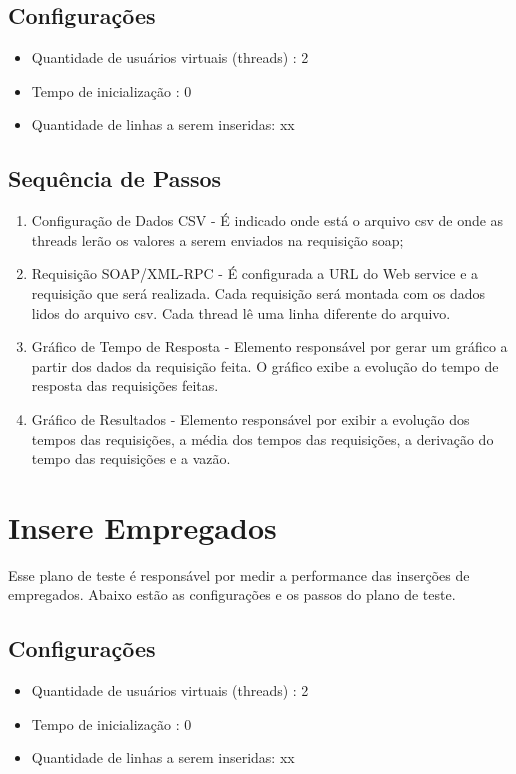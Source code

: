 \subsection{Configurações}

\begin{itemize}
\item Quantidade de usuários virtuais (threads) : 2
\item Tempo de inicialização : 0
\item Quantidade de linhas a serem inseridas: xx
\end{itemize}

\subsection{Sequência de Passos}

\begin{enumerate}
\item Configuração de Dados CSV - É indicado onde está o arquivo csv de onde as threads lerão os valores a serem enviados na requisição soap;
\item Requisição SOAP/XML-RPC - É configurada a URL do Web service e a requisição que será realizada. Cada requisição será montada com os dados lidos do arquivo csv. Cada thread lê uma linha diferente do arquivo.
\item Gráfico de Tempo de Resposta -  Elemento responsável por gerar um gráfico a partir dos dados da requisição feita. O gráfico exibe a  evolução do tempo de resposta das requisições feitas.
\item Gráfico de Resultados - Elemento responsável por exibir a evolução dos tempos das requisições, a média dos tempos das requisições, a derivação do tempo das requisições e a vazão.
\end{enumerate}


\section{Insere Empregados}

Esse plano de teste é responsável por medir a performance das inserções de empregados. Abaixo estão as configurações e os passos do plano de teste.

\subsection{Configurações}

\begin{itemize}
\item Quantidade de usuários virtuais (threads) : 2
\item Tempo de inicialização : 0
\item Quantidade de linhas a serem inseridas: xx
\end{itemize}

